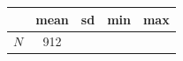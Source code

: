 {
\def\sym#1{\ifmmode^{#1}\else\(^{#1}\)\fi}
\begin{tabular}{l*{1}{cccc}}
\toprule
            &        mean&          sd&         min&         max\\
\midrule
\midrule
\(N\)       &         912&            &            &            \\
\bottomrule
\end{tabular}
}

